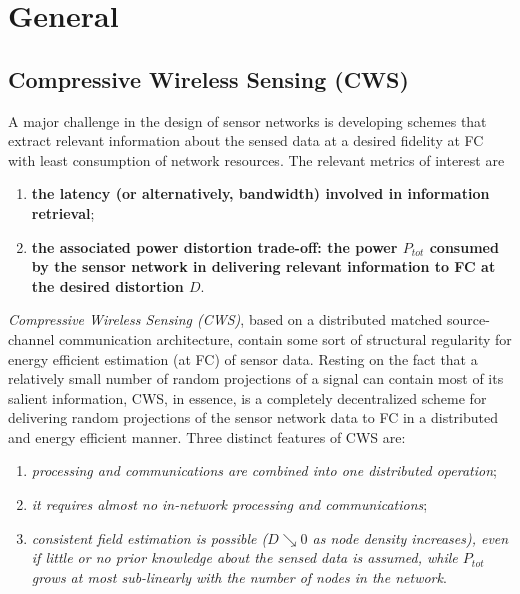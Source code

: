 \chapter{General}
\label{CWS}
\section{Compressive Wireless Sensing (CWS)}
\label{sec1.1}
A major challenge in the design of sensor networks is developing \textcolor[rgb]{0,0,1}{schemes that extract relevant information about the sensed data} at a desired fidelity at FC with \textcolor[rgb]{0,0,1}{least consumption of network resources}. The relevant metrics of interest are
\begin{enumerate}
    \item \textbf{\textcolor[rgb]{0,0,1}{the latency (or alternatively, bandwidth) involved in information retrieval}};
    \item \textbf{\textcolor[rgb]{0,0,1}{the associated power distortion trade-off: the power $P_{tot}$ consumed by the sensor network in delivering relevant information to FC at the desired distortion $D$}}.
\end{enumerate}

\emph{\textcolor[rgb]{0,0,1}{Compressive Wireless Sensing (CWS)}}, based on a distributed matched source-channel communication architecture, contain some sort of structural regularity for energy efficient estimation (at FC) of sensor data. Resting on the fact that a relatively small number of random projections of a signal can contain most of its salient information, CWS, in essence, is a completely decentralized scheme for delivering random projections of the sensor network data to FC in a distributed and energy efficient manner. Three distinct features of CWS are:
\begin{enumerate}
    \item \emph{\textcolor[rgb]{0,0,1}{processing and communications are combined into one distributed operation}};
    \item \emph{\textcolor[rgb]{0,0,1}{it requires almost no in-network processing and communications}};
    \item \emph{\textcolor[rgb]{0,0,1}{consistent field estimation is possible ($D\searrow0$ as node density increases), even if little or no prior knowledge about the sensed data is assumed, while $P_{tot}$ grows at most sub-linearly with the number of nodes in the network}}.
\end{enumerate}

